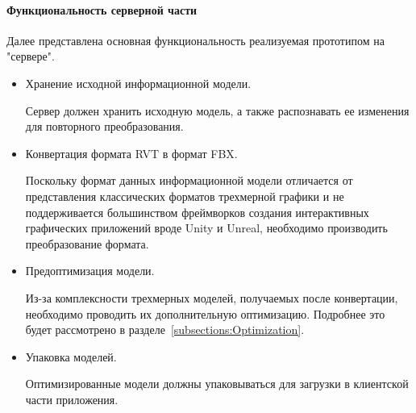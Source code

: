 ﻿\paragraph{Функциональность серверной части}

Далее представлена основная функциональность реализуемая прототипом на "сервере".

\begin{itemize}
    \item {
        Хранение исходной информационной модели.
        
        Сервер должен хранить исходную модель,
        а также распознавать ее изменения для повторного преобразования.
    }
    \item {
        Конвертация формата RVT в формат FBX.

        Поскольку формат данных информационной модели отличается от
        представления классических форматов трехмерной графики
        и не поддерживается большинством фреймворков
        создания интерактивных графических приложений
        вроде Unity и Unreal, необходимо производить
        преобразование формата.
    } 
    \item {
        Предоптимизация модели.

        Из-за комплексности трехмерных моделей,
        получаемых после конвертации,
        необходимо проводить их дополнительную оптимизацию.
        Подробнее это будет рассмотрено в разделе~\ref{subsections:Optimization}.
    }
    \item {
        Упаковка моделей.

        Оптимизированные модели должны упаковываться для
        загрузки в клиентской части приложения.
    }
\end{itemize}
